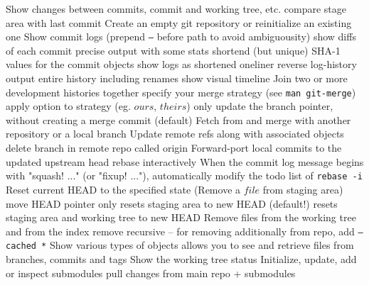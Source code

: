 	{Show changes between commits, commit and working tree, etc.}
	{compare stage area with last commit}
	{Create an empty git repository or reinitialize an existing one}
	{Show commit logs (prepend {\tt --} before path to avoid ambiguousity)}
	{show diffs of each commit}
	{precise output with some stats}
	{shortend (but unique) SHA-1 values for the commit objects }
	{show logs as shortened oneliner}
	{reverse log-history output}
	{entire history including renames}
	{show visual timeline}
	{Join two or more development histories together}
	{specify your merge strategy (see {\tt man git-merge})}
	{apply option to strategy (eg. $ours$, $theirs$)}
	{only update the branch pointer, without creating a merge commit (default)}
	{Fetch from and merge with another re\-pository or a local branch}
	{Update remote refs along with associated objects}
	{delete branch in remote repo called origin}
	{Forward-port local commits to the updated upstream head}
	{rebase interactively}
	{When the commit log message begins with "squash! ..." (or "fixup! ..."), automatically modify the todo list of {\tt rebase -i} }
	{Reset current HEAD to the specified state (Remove a $file$ from staging area)}
	{move HEAD pointer only}
	{resets staging area to new HEAD (default!)}
	{resets staging area and working tree to new HEAD}
	{Remove files from the working tree and from the index}
	{remove recursive -- for removing additionally from repo, add
{\tt --cached *}}
	{Show various types of objects}
	{allows you to see and retrieve files from bran\-ches, commits and tags}
	{Show the working tree status}
	{Initialize, update, add or inspect submodules}
	{pull changes from main repo + submodules}

